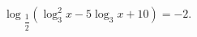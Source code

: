 \begin{ex}[type=equation]
	\begin{condition}
		$\log$\tiny$_{\dfrac{1}{2}}$\normalsize$ (\log_3^2 x - 5\log_3 x + 10) = -2.$
	\end{condition}
\end{ex}
